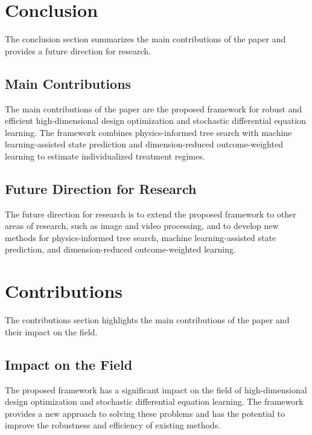 \documentclass{article}
\begin{document}
\section{Conclusion}

The conclusion section summarizes the main contributions of the paper and provides a future direction for research.

\subsection{Main Contributions}

The main contributions of the paper are the proposed framework for robust and efficient high-dimensional design optimization and stochastic differential equation learning. The framework combines physics-informed tree search with machine learning-assisted state prediction and dimension-reduced outcome-weighted learning to estimate individualized treatment regimes.

\subsection{Future Direction for Research}

The future direction for research is to extend the proposed framework to other areas of research, such as image and video processing, and to develop new methods for physics-informed tree search, machine learning-assisted state prediction, and dimension-reduced outcome-weighted learning.

\section{Contributions}

The contributions section highlights the main contributions of the paper and their impact on the field.

\subsection{Impact on the Field}

The proposed framework has a significant impact on the field of high-dimensional design optimization and stochastic differential equation learning. The framework provides a new approach to solving these problems and has the potential to improve the robustness and efficiency of existing methods.
\end{document}
